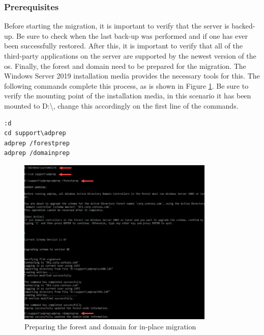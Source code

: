 \subsubsection{Prerequisites}
Before starting the migration, it is important to verify that the server is backed-up. Be sure to check when the last back-up was performed and if one has ever been successfully restored. After this, it is important to verify that all of the third-party applications on the server are supported by the newest version of the \acrshort{os}. Finally, the forest and domain need to be prepared for the migration. The Windows Server 2019 installation media provides the necessary tools for this. The following commands complete this process, as is shown in Figure \ref{fig:Prerequisites}. Be sure to verify the mounting point of the installation media, in this scenario it has been mounted to D:\textbackslash{}, change this accordingly on the first line of the commands.

\begin{lstlisting}[breaklines]
:d
cd support\adprep
adprep /forestprep
adprep /domainprep
\end{lstlisting}

\begin{figure}[h]
	\includegraphics[height=8cm]{img/Methodologie/Prerequisites0.png}
	\captionsetup{width=0.8\linewidth}
	\centering		
	\caption[Preparing forest and domain ]{Preparing the forest and domain for in-place migration}
	\label{fig:Prerequisites}
\end{figure}

